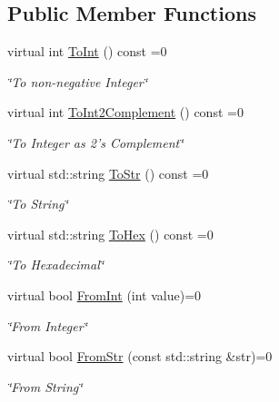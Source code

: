 \subsection*{Public Member Functions}
\begin{DoxyCompactItemize}
\item 
virtual int \hyperlink{classiWord_adcef1925ad309d54c9a3e896af5d5350}{ToInt} () const =0
\begin{DoxyCompactList}\small\item\em \char`\"{}To non-\/negative Integer\char`\"{} \item\end{DoxyCompactList}\item 
virtual int \hyperlink{classiWord_a68129605beb127647ecc59129f1c07f7}{ToInt2Complement} () const =0
\begin{DoxyCompactList}\small\item\em \char`\"{}To Integer as 2's Complement\char`\"{} \item\end{DoxyCompactList}\item 
virtual std::string \hyperlink{classiWord_acebcfc4edd3498c962a6a2379a88accf}{ToStr} () const =0
\begin{DoxyCompactList}\small\item\em \char`\"{}To String\char`\"{} \item\end{DoxyCompactList}\item 
virtual std::string \hyperlink{classiWord_a7d7cb4facca44fc785899d01e47f29b1}{ToHex} () const =0
\begin{DoxyCompactList}\small\item\em \char`\"{}To Hexadecimal\char`\"{} \item\end{DoxyCompactList}\item 
virtual bool \hyperlink{classiWord_a1229f8249c32e01ccee035a205954a62}{FromInt} (int value)=0
\begin{DoxyCompactList}\small\item\em \char`\"{}From Integer\char`\"{} \item\end{DoxyCompactList}\item 
virtual bool \hyperlink{classiWord_a6e40a4873ca945b119318a85c75a0fcf}{FromStr} (const std::string \&str)=0
\begin{DoxyCompactList}\small\item\em \char`\"{}From String\char`\"{} \item\end{DoxyCompactList}\item 

\end{DoxyCompactItemize}
